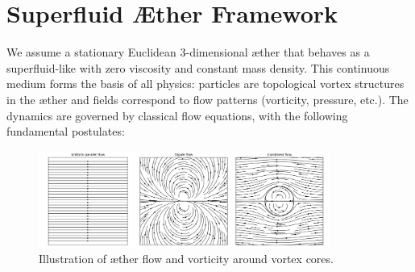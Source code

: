 
\section{Superfluid Æther Framework}

We assume a stationary Euclidean 3-dimensional æther that behaves as a superfluid-like with zero viscosity and constant mass density. This continuous medium forms the basis of all physics: particles are topological vortex structures in the æther and fields correspond to flow patterns (vorticity, pressure, etc.). The dynamics are governed by classical flow equations, with the following fundamental postulates:

\begin{figure}[htbp]
    \centering
    \includegraphics[width=0.85\textwidth]{images/03-combined_flow}
    \caption{Illustration of æther flow and vorticity around vortex cores.}
    \label{fig:vortexfields}
\end{figure}
